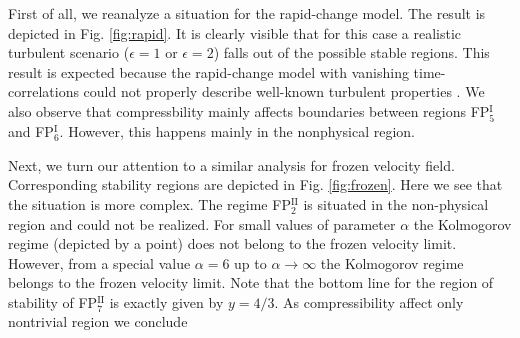 \documentclass[aps,pre,url,twocolumn,superscriptaddress]{revtex4-1}
\newcommand{\fp}[2]{FP$^{\textrm{#1}}_{#2}$}
\begin{document}
First of all, we reanalyze a situation for the rapid-change model. The result
is depicted in Fig. \ref{fig:rapid}. It is clearly visible that for this case
 a realistic turbulent scenario ($\epsilon=1$ or $\epsilon=2$) falls out of the 
possible stable regions. This result is expected because the rapid-change model with
vanishing time-correlations could not properly describe well-known
turbulent properties \cite{Frisch,Monin}. We also observe that compressbility
mainly affects boundaries between regions \fp{I}{5} and \fp{I}{6}. However, this
happens mainly in the nonphysical region.


Next, we turn our attention to a
similar analysis for frozen velocity field. Corresponding stability
regions are depicted in Fig. \ref{fig:frozen}.
Here we see that the situation is more complex. 
The regime \fp{II}{2} is situated in the non-physical region and could not be realized. 
For small values of parameter $\alpha$
the Kolmogorov regime (depicted by a point) does not belong to the frozen velocity limit. 
However,
from a special value $\alpha = 6$ up to $\alpha\rightarrow\infty$ the Kolmogorov
regime belongs to the frozen velocity limit. Note that the bottom line for the region of
stability of \fp{II}{7} is exactly given by $y=4/3$. As compressibility affect
only nontrivial region we conclude
\end{document}
